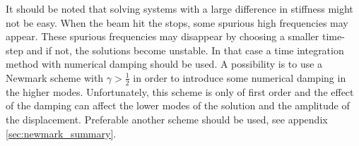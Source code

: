 It should be noted that solving systems with a large difference in stiffness
might not be easy. When the beam hit the stops, some spurious high frequencies
may appear. These spurious frequencies may disappear by choosing a smaller
time-step and if not, the solutions become unstable. In that case a time
integration method with numerical damping should be used. A possibility is to
use a Newmark scheme with $\gamma > \frac{1}{2}$ in order to introduce some
numerical damping in the higher modes. Unfortunately, this scheme is only of
first order and the effect of the damping can affect the lower modes of the
solution and the amplitude of the displacement. Preferable another scheme should
be used, see appendix \ref{sec:newmark_summary}.


\FloatBarrier


